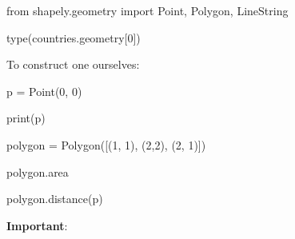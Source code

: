 \documentclass[
  letterpaper,
  DIV=11,
  numbers=noendperiod]{scrreprt}
\newenvironment{Shaded}{\begin{snugshade}}{\end{snugshade}}
\newcommand{\BuiltInTok}[1]{\textcolor[rgb]{0.00,0.23,0.31}{#1}}
\newcommand{\DecValTok}[1]{\textcolor[rgb]{0.68,0.00,0.00}{#1}}
\newcommand{\ImportTok}[1]{\textcolor[rgb]{0.00,0.46,0.62}{#1}}
\newcommand{\NormalTok}[1]{\textcolor[rgb]{0.00,0.23,0.31}{#1}}
\newcommand{\OperatorTok}[1]{\textcolor[rgb]{0.37,0.37,0.37}{#1}}
\begin{document}
\begin{Shaded}
\begin{Highlighting}[]
\ImportTok{from}\NormalTok{ shapely.geometry }\ImportTok{import}\NormalTok{ Point, Polygon, LineString}
\end{Highlighting}
\end{Shaded}

\begin{Shaded}
\begin{Highlighting}[]
\BuiltInTok{type}\NormalTok{(countries.geometry[}\DecValTok{0}\NormalTok{])}
\end{Highlighting}
\end{Shaded}

To construct one ourselves:

\begin{Shaded}
\begin{Highlighting}[]
\NormalTok{p }\OperatorTok{=}\NormalTok{ Point(}\DecValTok{0}\NormalTok{, }\DecValTok{0}\NormalTok{)}
\end{Highlighting}
\end{Shaded}

\begin{Shaded}
\begin{Highlighting}[]
\BuiltInTok{print}\NormalTok{(p)}
\end{Highlighting}
\end{Shaded}

\begin{Shaded}
\begin{Highlighting}[]
\NormalTok{polygon }\OperatorTok{=}\NormalTok{ Polygon([(}\DecValTok{1}\NormalTok{, }\DecValTok{1}\NormalTok{), (}\DecValTok{2}\NormalTok{,}\DecValTok{2}\NormalTok{), (}\DecValTok{2}\NormalTok{, }\DecValTok{1}\NormalTok{)])}
\end{Highlighting}
\end{Shaded}

\begin{Shaded}
\begin{Highlighting}[]
\NormalTok{polygon.area}
\end{Highlighting}
\end{Shaded}

\begin{Shaded}
\begin{Highlighting}[]
\NormalTok{polygon.distance(p)}
\end{Highlighting}
\end{Shaded}

\textbf{Important}:
\end{document}

